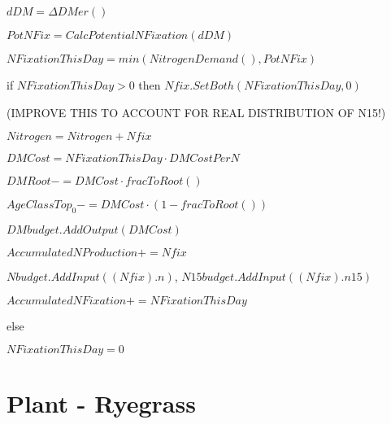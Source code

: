 \documentclass[%
]{scrartcl}
\begin{document}
   $dDM =  \Delta DMer()$

   $PotNFix   = CalcPotentialNFixation(dDM)$

   $NFixationThisDay = min(NitrogenDemand(),PotNFix)$

   if $NFixationThisDay>0$ then
 $Nfix.SetBoth(NFixationThisDay,0)$                   

\quad (IMPROVE THIS TO ACCOUNT FOR REAL DISTRIBUTION OF N15!)

\quad $Nitrogen = Nitrogen + Nfix$

    \quad   $DMCost = NFixationThisDay  \cdot  DMCostPerN$

     \quad  $DMRoot   -= DMCost  \cdot  fracToRoot()$

      \quad $AgeClassTop_0 -= DMCost  \cdot  (1-fracToRoot())$

     \quad  $DMbudget.AddOutput(DMCost)$
   
\quad $AccumulatedNProduction += Nfix$

   \quad $Nbudget.AddInput((Nfix).n)$,  
  $N15budget.AddInput((Nfix).n15)$

   \quad $AccumulatedNFixation += NFixationThisDay$
  
   else

\quad $NFixationThisDay=0$


\section{Plant - Ryegrass}


%







\end{document}
